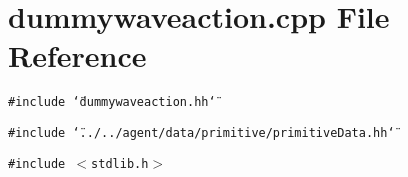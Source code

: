 \section{dummywaveaction.cpp File Reference}
\label{dummywaveaction_8cpp}


{\tt \#include \char`\"{}dummywaveaction.hh\char`\"{}}\par
{\tt \#include \char`\"{}../../agent/data/primitive/primitiveData.hh\char`\"{}}\par
{\tt \#include $<$stdlib.h$>$}\par

